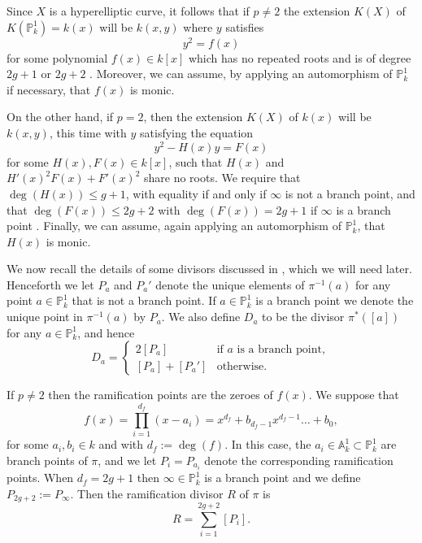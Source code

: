 \documentclass[11pt]{article} %
\theoremstyle{plain}
\theoremstyle{remark}
\begin{document}
Since $X$ is a hyperelliptic curve, it follows that if $p \neq 2$ the extension $K(X)$ of $K(\mathbb P_k^1) = k(x)$ will be $k(x,y)$ where $y$ satisfies
\begin{equation}\label{definingequationpnot2}
y^2 = f(x)
\end{equation}
for some polynomial $f(x) \in k[x]$ which has no repeated roots and is of degree $2g+1$ or $2g+2$ \cite[Prop 7.4.24]{liu}.
Moreover, we can assume, by applying an automorphism of $\mathbb P_k^1$ if necessary, that $f(x)$ is monic.

On the other hand, if $p=2$, then the extension $K(X)$ of $k(x)$ will be $k(x,y)$, this time with $y$ satisfying the equation
\begin{equation}\label{definep=2}
y^2 - H(x)y = F(x)
\end{equation}
for some $H(x),F(x) \in k[x]$, such that $H(x)$ and $H'(x)^2F(x) + F'(x)^2$ share no roots.
We require that $\deg(H(x)) \leq g+1$, with equality if and only if $\infty$ is not a branch point, and that $\deg(F(x)) \leq 2g+2$ with $\deg(F(x)) = 2g+1$ if $\infty$ is a branch point  \cite[Prop 7.4.24]{liu}.
Finally, we can assume, again applying an automorphism of $\mathbb P_k^1$, that $H(x)$ is monic.

We now recall the details of some divisors discussed in \cite{faithfulaction}, which we will need later.
Henceforth we let $P_a$ and $P_a'$ denote the unique elements of $\pi^{-1}(a)$ for any point $a \in \mathbb P_k^1$ that is not a branch point.
If $a \in \mathbb P_k^1$ is a branch point we denote the unique point in $\pi^{-1}(a)$ by $P_a$.
We also define $D_a$ to be the divisor $\pi^*\left([a]\right)$ for any $a \in \mathbb P_k^1$, and hence
\begin{equation*}
D_a= 
\begin{cases}
 2[P_a] & \text{if $a$ is a branch point}, \\
 [P_a] + [P_a'] & \text{otherwise.}
\end{cases}
\end{equation*}

If $p \neq 2$ then the ramification points are the zeroes of $f(x)$.
We suppose that 
\[
f(x) = \prod_{i=1}^{d_f} (x-a_i) = x^{d_f} + b_{d_f - 1}x^{d_f-1} \ldots + b_0,
\]
for some $a_i, b_i \in k$ and with $d_f := \deg(f) $.
In this case, the $a_i \in \mathbb A_k^1 \subset \mathbb P_k^1$ are branch points of $\pi$, and we let $P_i = P_{a_i}$ denote the corresponding ramification points.
When $d_f = 2g+1$ then $\infty \in \mathbb P_k^1$ is a branch point and we define $P_{2g+2} := P_\infty$.
Then the ramification divisor $R$ of $\pi$ is
\[
R = \sum_{i=1}^{2g+2} [P_i] .
\]
\end{document}
